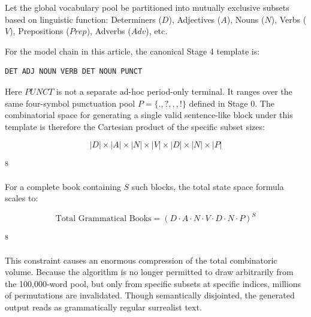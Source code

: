 \documentclass[
  11pt,
  a4paper,
]{article}
\begin{document}
Let the global vocabulary pool be partitioned into mutually exclusive subsets based on linguistic function: Determiners (\(D\)), Adjectives (\(A\)), Nouns (\(N\)), Verbs (\(V\)), Prepositions (\(Prep\)), Adverbs (\(Adv\)), etc.

For the model chain in this article, the canonical Stage 4 template is:

\begin{lstlisting}[style=babelpython]
DET ADJ NOUN VERB DET NOUN PUNCT
\end{lstlisting}

Here \(PUNCT\) is not a separate ad-hoc period-only terminal. It ranges over the same four-symbol punctuation pool \(P=\{\mathtt{.}, \mathtt{?}, \mathtt{,}, \mathtt{!}\}\) defined in Stage 0. The combinatorial space for generating a single valid sentence-like block under this template is therefore the Cartesian product of the specific subset sizes:

\[
|D| \times |A| \times |N| \times |V| \times |D| \times |N| \times |P|
\]

\textsuperscript{8}

For a complete book containing \(S\) such blocks, the total state space formula scales to:

\[
\text{Total Grammatical Books}=(D \cdot A \cdot N \cdot V \cdot D \cdot N \cdot P)^S
\]

\textsuperscript{8}

This constraint causes an enormous compression of the total combinatoric volume. Because the algorithm is no longer permitted to draw arbitrarily from the 100,000-word pool, but only from specific subsets at specific indices, millions of permutations are invalidated. Though semantically disjointed, the generated output reads as grammatically regular surrealist text.
\end{document}
